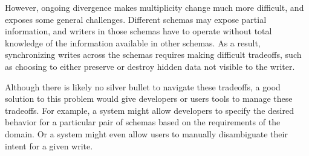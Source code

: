 \documentclass[english,submission]{programming}
\begin{document}
However, ongoing divergence makes multiplicity change much more difficult, and exposes some general challenges. Different schemas may expose partial information, and writers in those schemas have to operate without total knowledge of the information available in other schemas. As a result, synchronizing writes across the schemas requires making difficult tradeoffs, such as choosing to either preserve or destroy hidden data not visible to the writer.

Although there is likely no silver bullet to navigate these tradeoffs, a good solution to this problem would give developers or users tools to manage these tradeoffs. For example, a system might allow developers to specify the desired behavior for a particular pair of schemas based on the requirements of the domain. Or a system might even allow users to manually disambiguate their intent for a given write.

\end{document}
